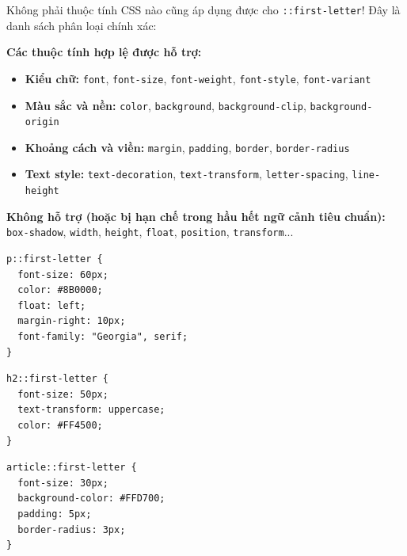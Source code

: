 \documentclass[11pt,oneside]{book}
\newcommand{\codeinline}[1]{\textcolor{accentOrange}{\texttt{#1}}}
\begin{document}
\begin{warnBox}
Không phải thuộc tính CSS nào cũng áp dụng được cho \codeinline{::first-letter}! Đây là danh sách phân loại chính xác:
\par\vspace{4pt}
\textbf{Các thuộc tính hợp lệ được hỗ trợ:}
\begin{itemize}[leftmargin=1.5em, itemsep=2pt, parsep=0pt]
    \item \textbf{Kiểu chữ:} \codeinline{font}, \codeinline{font-size}, \codeinline{font-weight}, \codeinline{font-style}, \codeinline{font-variant}
    \item \textbf{Màu sắc và nền:} \codeinline{color}, \codeinline{background}, \codeinline{background-clip}, \codeinline{background-origin}
    \item \textbf{Khoảng cách và viền:} \codeinline{margin}, \codeinline{padding}, \codeinline{border}, \codeinline{border-radius}
    \item \textbf{Text style:} \codeinline{text-decoration}, \codeinline{text-transform}, \codeinline{letter-spacing}, \codeinline{line-height}
\end{itemize}
\par\vspace{4pt}
\textbf{Không hỗ trợ (hoặc bị hạn chế trong hầu hết ngữ cảnh tiêu chuẩn):} \codeinline{box-shadow}, \codeinline{width}, \codeinline{height}, \codeinline{float}, \codeinline{position}, \codeinline{transform}...
\end{warnBox}

\begin{codeWindow}
\begin{lstlisting}[language=CSS3]
p::first-letter {
  font-size: 60px;
  color: #8B0000;
  float: left;
  margin-right: 10px;
  font-family: "Georgia", serif;
}
\end{lstlisting}
\end{codeWindow}

\begin{codeWindow}
\begin{lstlisting}[language=CSS3]
h2::first-letter {
  font-size: 50px;
  text-transform: uppercase;
  color: #FF4500;
}
\end{lstlisting}
\end{codeWindow}

\begin{codeWindow}
\begin{lstlisting}[language=CSS3]
article::first-letter {
  font-size: 30px;
  background-color: #FFD700;
  padding: 5px;
  border-radius: 3px;
}
\end{lstlisting}
\end{codeWindow}
\end{document}
